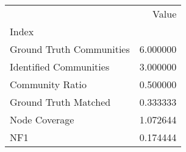 \begin{tabular}{lr}
\toprule
{} &     Value \\
Index                    &           \\
\midrule
Ground Truth Communities &  6.000000 \\
Identified Communities   &  3.000000 \\
Community Ratio          &  0.500000 \\
Ground Truth Matched     &  0.333333 \\
Node Coverage            &  1.072644 \\
NF1                      &  0.174444 \\
\bottomrule
\end{tabular}
